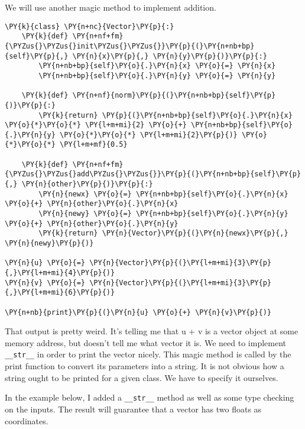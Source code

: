 We will use another magic method to implement addition.

\begin{Verbatim}[commandchars=\\\{\}]
\PY{k}{class} \PY{n+nc}{Vector}\PY{p}{:}
    \PY{k}{def} \PY{n+nf+fm}{\PYZus{}\PYZus{}init\PYZus{}\PYZus{}}\PY{p}{(}\PY{n+nb+bp}{self}\PY{p}{,} \PY{n}{x}\PY{p}{,} \PY{n}{y}\PY{p}{)}\PY{p}{:}
        \PY{n+nb+bp}{self}\PY{o}{.}\PY{n}{x} \PY{o}{=} \PY{n}{x}
        \PY{n+nb+bp}{self}\PY{o}{.}\PY{n}{y} \PY{o}{=} \PY{n}{y}

    \PY{k}{def} \PY{n+nf}{norm}\PY{p}{(}\PY{n+nb+bp}{self}\PY{p}{)}\PY{p}{:}
        \PY{k}{return} \PY{p}{(}\PY{n+nb+bp}{self}\PY{o}{.}\PY{n}{x} \PY{o}{*}\PY{o}{*} \PY{l+m+mi}{2} \PY{o}{+} \PY{n+nb+bp}{self}\PY{o}{.}\PY{n}{y} \PY{o}{*}\PY{o}{*} \PY{l+m+mi}{2}\PY{p}{)} \PY{o}{*}\PY{o}{*} \PY{l+m+mf}{0.5}

    \PY{k}{def} \PY{n+nf+fm}{\PYZus{}\PYZus{}add\PYZus{}\PYZus{}}\PY{p}{(}\PY{n+nb+bp}{self}\PY{p}{,} \PY{n}{other}\PY{p}{)}\PY{p}{:}
        \PY{n}{newx} \PY{o}{=} \PY{n+nb+bp}{self}\PY{o}{.}\PY{n}{x} \PY{o}{+} \PY{n}{other}\PY{o}{.}\PY{n}{x}
        \PY{n}{newy} \PY{o}{=} \PY{n+nb+bp}{self}\PY{o}{.}\PY{n}{y} \PY{o}{+} \PY{n}{other}\PY{o}{.}\PY{n}{y}
        \PY{k}{return} \PY{n}{Vector}\PY{p}{(}\PY{n}{newx}\PY{p}{,} \PY{n}{newy}\PY{p}{)}

\PY{n}{u} \PY{o}{=} \PY{n}{Vector}\PY{p}{(}\PY{l+m+mi}{3}\PY{p}{,}\PY{l+m+mi}{4}\PY{p}{)}
\PY{n}{v} \PY{o}{=} \PY{n}{Vector}\PY{p}{(}\PY{l+m+mi}{3}\PY{p}{,}\PY{l+m+mi}{6}\PY{p}{)}

\PY{n+nb}{print}\PY{p}{(}\PY{n}{u} \PY{o}{+} \PY{n}{v}\PY{p}{)}
\end{Verbatim}



That output is pretty weird.  It's telling me that u + v is a vector object at some memory address, but doesn't tell me what vector it is.  We need to implement \texttt{\_\_str\_\_} in order to print the vector nicely.  This magic method is called by the print function to convert its parameters into a string.  It is not obvious how a string ought to be printed for a given class.  We have to specify it ourselves.


In the example below, I added a \texttt{\_\_str\_\_} method as well as some type checking on the inputs.  The result will guarantee that a vector has two floats as coordinates.

